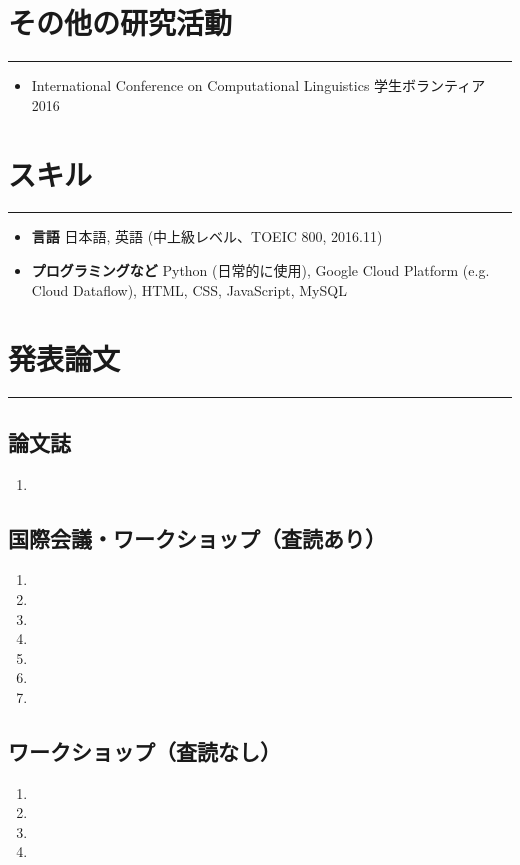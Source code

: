 \documentclass[a4paper,11pt]{ltjsarticle}
\newcommand{\sectrule}{
    \vspace*{-1.1\baselineskip}
    \noindent\rule{\linewidth}{3pt}}
\newcommand{\NewPart}[1]{\section*{\uppercase{#1}}\sectrule}
\begin{document}
\NewPart{その他の研究活動}{}
\begin{itemize}[leftmargin=2em,topsep=0.5em,itemsep=0em]
    \item International Conference on Computational Linguistics 学生ボランティア \hfill 2016
\end{itemize}

\NewPart{スキル}{}
\begin{itemize}[leftmargin=2em,topsep=0.5em,itemsep=0em]
    \item \textbf{言語}\hspace{1em} 日本語, 英語 (中上級レベル、TOEIC 800, 2016.11)
    \item \textbf{プログラミングなど}\hspace{1em} Python (日常的に使用), Google Cloud Platform (e.g. Cloud Dataflow), HTML, CSS, JavaScript, MySQL
\end{itemize}

\newpage

\NewPart{発表論文}{}
\vspace*{-\baselineskip}
\subsection*{論文誌}
\begin{enumerate}[leftmargin=2em,topsep=0.5em,itemsep=0em]
    \item {}
\end{enumerate}

\subsection*{国際会議・ワークショップ（査読あり）}
\begin{enumerate}[leftmargin=2em,topsep=0.5em,itemsep=0em]
    \item {}
    \item {}
    \item {}
    \item {}
    \item {}
    \item {}
    \item {}
\end{enumerate}

\subsection*{ワークショップ（査読なし）}
\begin{enumerate}[leftmargin=2em,topsep=0.5em,itemsep=0em]
    \item {}
    \item {}
    \item {}
    \item {}
\end{enumerate}
\end{document}
